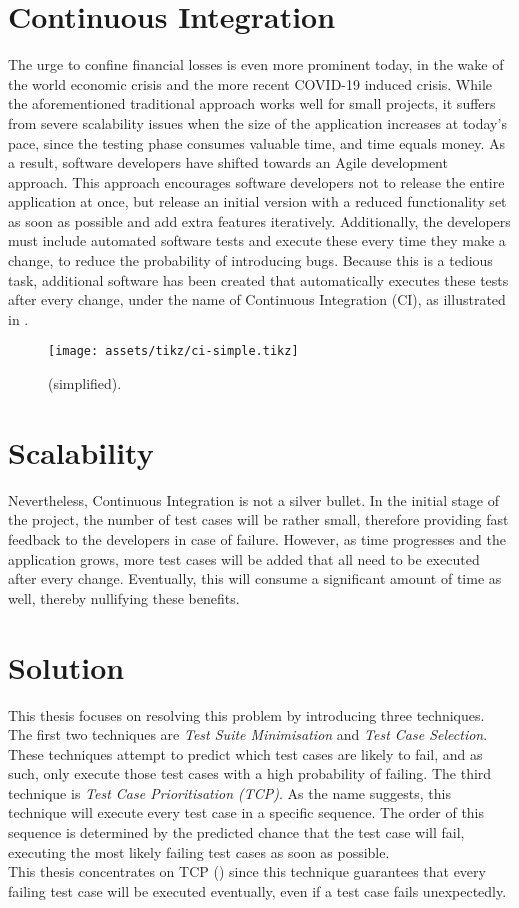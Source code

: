 \section*{Continuous Integration}
The urge to confine financial losses is even more prominent today, in the wake of the world economic crisis and the more recent COVID-19 induced crisis. While the aforementioned traditional approach works well for small projects, it suffers from severe scalability issues when the size of the application increases at today's pace, since the testing phase consumes valuable time, and time equals money. As a result, software developers have shifted towards an Agile development approach. This approach encourages software developers not to release the entire application at once, but release an initial version with a reduced functionality set as soon as possible and add extra features iteratively. Additionally, the developers must include automated software tests and execute these every time they make a change, to reduce the probability of introducing bugs. Because this is a tedious task, additional software has been created that automatically executes these tests after every change, under the name of Continuous Integration (CI), as illustrated in .

\begin{figure}[h!]
	\centering
	\texttt{[image: assets/tikz/ci-simple.tikz]}
	\caption{\CI{} (simplified).}
	\label{fig:ci}
\end{figure}

\section*{Scalability}
Nevertheless, Continuous Integration is not a silver bullet. In the initial stage of the project, the number of test cases will be rather small, therefore providing fast feedback to the developers in case of failure. However, as time progresses and the application grows, more test cases will be added that all need to be executed after every change. Eventually, this will consume a significant amount of time as well, thereby nullifying these benefits.

\section*{Solution}
This thesis focuses on resolving this problem by introducing three techniques. The first two techniques are \emph{Test Suite Minimisation} and \emph{Test Case Selection}. These techniques attempt to predict which test cases are likely to fail, and as such, only execute those test cases with a high probability of failing. The third technique is \emph{Test Case Prioritisation (TCP)}. As the name suggests, this technique will execute every test case in a specific sequence. The order of this sequence is determined by the predicted chance that the test case will fail, executing the most likely failing test cases as soon as possible.\\ This thesis concentrates on TCP () since this technique guarantees that every failing test case will be executed eventually, even if a test case fails unexpectedly.

